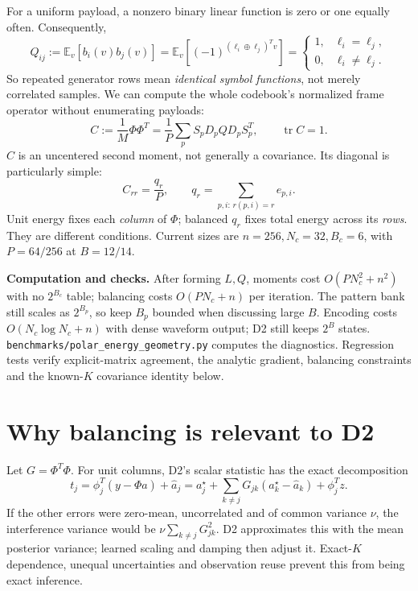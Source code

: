 \documentclass[10pt,a4paper]{article}
\newcommand{\E}{\mathbb E}
\newcommand{\tr}{\operatorname{tr}}
\begin{document}
For a uniform payload, a nonzero binary linear function is zero or one equally often. Consequently,
\begin{equation}
 Q_{ij}:=\E_v[b_i(v)b_j(v)]
 =\E_v[(-1)^{(\ell_i\oplus\ell_j)^Tv}]
 =\begin{cases}1,&\ell_i=\ell_j,\\0,&\ell_i\ne\ell_j.\end{cases}
 \label{eq:Q}
\end{equation}
So repeated generator rows mean \emph{identical symbol functions}, not merely correlated samples. We can compute
the whole codebook's normalized frame operator without enumerating payloads:
\begin{equation}
 \boxed{C:=\frac1M\Phi\Phi^T=\frac1P\sum_p S_pD_pQD_pS_p^T},\qquad \tr C=1.
 \label{eq:C}
\end{equation}
$C$ is an uncentered second moment, not generally a covariance. Its diagonal is particularly simple:
\begin{equation}
 C_{rr}=\frac{q_r}{P},\qquad q_r=\sum_{p,i:\,r(p,i)=r}e_{p,i}.
 \label{eq:rows}
\end{equation}
Unit energy fixes each \emph{column} of $\Phi$; balanced $q_r$ fixes total energy across its \emph{rows}.
They are different conditions. Current sizes are $n=256,N_c=32,B_c=6$, with $P=64/256$ at $B=12/14$.

\textbf{Computation and checks.} After forming $L,Q$, moments cost $O(PN_c^2+n^2)$ with no $2^{B_c}$ table;
balancing costs $O(PN_c+n)$ per iteration. The pattern bank still scales as $2^{B_p}$, so keep $B_p$ bounded when
discussing large $B$. Encoding costs $O(N_c\log N_c+n)$ with dense waveform output; D2 still keeps $2^B$ states.
\texttt{benchmarks/polar\_energy\_geometry.py} computes the diagnostics. Regression tests verify explicit-matrix
agreement, the analytic gradient, balancing constraints and the known-$K$ covariance identity below.

\clearpage
\section{Why balancing is relevant to D2}
Let $G=\Phi^T\Phi$. For unit columns, D2's scalar statistic has the exact decomposition
\begin{equation}
 t_j=\phi_j^T(y-\Phi\widehat a)+\widehat a_j
 =a_j^\star+\sum_{k\ne j}G_{jk}(a_k^\star-\widehat a_k)+\phi_j^Tz.
\end{equation}
If the other errors were zero-mean, uncorrelated and of common variance $\nu$, the interference variance would be
$\nu\sum_{k\ne j}G_{jk}^2$. D2 approximates this with the mean posterior variance; learned scaling and damping then
adjust it. Exact-$K$ dependence, unequal uncertainties and observation reuse prevent this from being exact inference.
\end{document}
